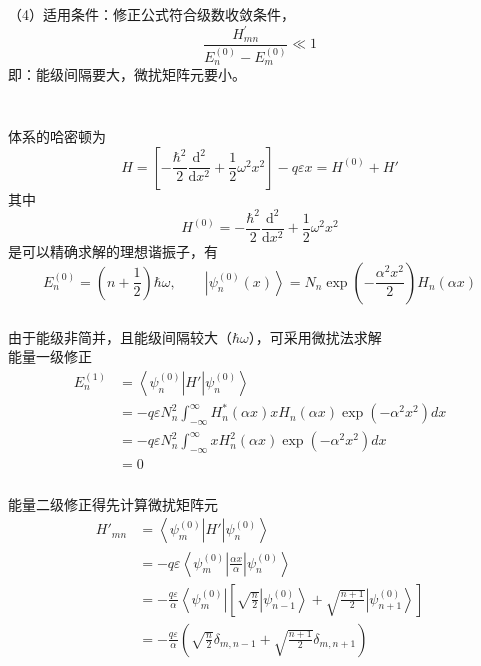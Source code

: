 \begin{frame}
  \frametitle{}
（4）适用条件：修正公式符合级数收敛条件，
\[\frac{H^{\prime}_{mn}}{E_n^{(0)}-E_m^{(0)}} \ll 1\]
即：能级间隔要大，微扰矩阵元要小。
\end{frame} 

\begin{frame}
  \frametitle{}
  ~~\\ 
  \解 体系的哈密顿为
  \[ H = \left[- \frac{\hbar^2}{2 } \frac{\mathrm{d}^2}{\mathrm{d}x^2} + \frac{1}{2}\omega ^2 x^2\right] -q \varepsilon x = H^{(0)} + H'\]
  其中
  \[H^{(0)} = - \frac{\hbar^2}{2 } \frac{\mathrm{d}^2}{\mathrm{d}x^2} + \frac{1}{2}\omega ^2 x^2 \]
  是可以精确求解的理想谐振子，有
  \[E^{(0)}_n = \left(n+\frac{1}{2}\right)\hbar \omega, \qquad \left|\psi^{(0)}_n (x)\right\rangle = N_n \exp(-\frac{\alpha ^2 x^2}{2}) H_n(\alpha x)  \]
\end{frame} 

\begin{frame}
  \frametitle{}
由于能级非简并，且能级间隔较大（$\hbar \omega $），可采用微扰法求解\\
能量一级修正
$$
\begin{aligned}
  E_n^{(1)} &= \left\langle \psi ^{(0)} _n \right|H' \left|\psi ^{(0)} _n \right\rangle \\ 
  &= -q \varepsilon N^2_n \int_{-\infty}^{\infty} H^* _n (\alpha x) x H_n (\alpha x) \exp(-\alpha ^2 x^2) dx \\ 
  &= -q \varepsilon N^2_n \int_{-\infty}^{\infty} x H^2 _n(\alpha x) \exp(-\alpha ^2 x^2) dx \\
 &= 0
\end{aligned} $$
\end{frame} 

\begin{frame}
  \frametitle{}
  能量二级修正得先计算微扰矩阵元
  $$
\begin{aligned}
  H'_{mn} &= \left\langle \psi ^{(0)} _m \right|H' \left|\psi ^{(0)} _n \right\rangle \\ 
  &= -q \varepsilon \left\langle \psi ^{(0)} _m \right| \frac{\alpha x}{\alpha} \left|\psi ^{(0)} _n \right\rangle \\
  &=  - \frac{q\varepsilon}{\alpha} \left\langle \psi ^{(0)} _m \right|  \left[\sqrt{\frac{n}{2}} \left|\psi ^{(0)} _{n-1} \right\rangle + \sqrt{\frac{n+1}{2 }} \left|\psi ^{(0)} _{n+1} \right\rangle\right] \\
  &= - \frac{q\varepsilon}{\alpha}\left(\sqrt{\frac{n}{2}} \delta _{m, n-1} +  \sqrt{\frac{n+1}{2}} \delta _{m, n+1}\right)
\end{aligned} $$
\end{frame} 

